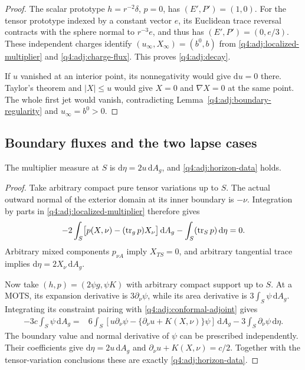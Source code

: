 \begin{proof}
The scalar prototype $h=r^{-2}\delta$, $p=0$, has $(E',P')=(1,0)$.
For the tensor prototype indexed by a constant vector $e$, its Euclidean
trace reversal contracts with the sphere normal to $r^{-3}e$, and thus has
$(E',P')=(0,e/3)$.  These independent charges identify
$(u_\infty,X_\infty)=(b^0,b)$ from \eqref{q4:adj:localized-multiplier} and
\eqref{q4:adj:charge-flux}.  This proves \eqref{q4:adj:decay}.

If $u$ vanished at an interior point, its nonnegativity would give
$\mathrm du=0$ there.  Taylor's theorem and $|X|\le u$ would give
$X=0$ and $\nabla X=0$ at the same point.  The whole first jet would vanish,
contradicting Lemma~\ref{q4:adj:boundary-regularity} and $u_\infty=b^0>0$.
\end{proof}

\subsection{Boundary fluxes and the two lapse cases}

\begin{lemma}
\label{q4:adj:boundary-data}
The multiplier measure at $S$ is $\mathrm d\eta=2u\,\mathrm dA_g$, and
\eqref{q4:adj:horizon-data} holds.
\end{lemma}

\begin{proof}
Take arbitrary compact pure tensor variations up to $S$.  The actual outward
normal of the exterior domain at its inner boundary is $-\nu$.  Integration
by parts in \eqref{q4:adj:localized-multiplier} therefore gives
\[
 -2\int_S\bigl[p(X,\nu)-(\operatorname{tr}_gp)X_\nu\bigr]\,\mathrm dA_g
      -\int_S(\operatorname{tr}_Sp)\,\mathrm d\eta=0.
\]
Arbitrary mixed components $p_{\nu A}$ imply $X_{TS}=0$, and arbitrary
tangential trace implies $\mathrm d\eta=2X_\nu\,\mathrm dA_g$.

Now take $(h,p)=(2\psi g,\psi K)$ with arbitrary compact support up to $S$.
At a MOTS, its expansion derivative is $3\partial_\nu\psi$, while its area
derivative is $3\int_S\psi\,\mathrm dA_g$.  Integrating its constraint
pairing with \eqref{q4:adj:conformal-adjoint} gives
\begin{align*}
 -3c\int_S\psi\,\mathrm dA_g
 ={}&6\int_S\left[u\partial_\nu\psi
       -\{\partial_\nu u+K(X,\nu)\}\psi\right]\,\mathrm dA_g
       -3\int_S\partial_\nu\psi\,\mathrm d\eta.
\end{align*}
The boundary value and normal derivative of $\psi$ can be prescribed
independently.  Their coefficients give $\mathrm d\eta=2u\,\mathrm dA_g$
and $\partial_\nu u+K(X,\nu)=c/2$.  Together with the tensor-variation
conclusions these are exactly \eqref{q4:adj:horizon-data}.
\end{proof}

